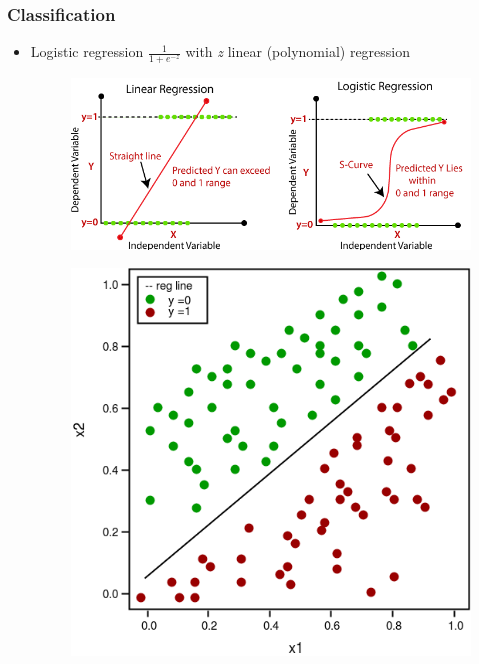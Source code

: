 \begin{frame}\frametitle{Classification}
   \begin{itemize}
      \item Logistic regression
      $\frac{1}{1 + e^{-z}}$ with \textit{z} linear (polynomial) regression
      \begin{figure}[H]
         \includegraphics[scale=.35]{../images/illustrations/model_logistic_regression.png}
      \end{figure}
      \begin{figure}[H]
         \includegraphics[scale=.2]{../images/illustrations/model_logistic_regression_example.png}
      \end{figure}
   \end{itemize}
\end{frame}



